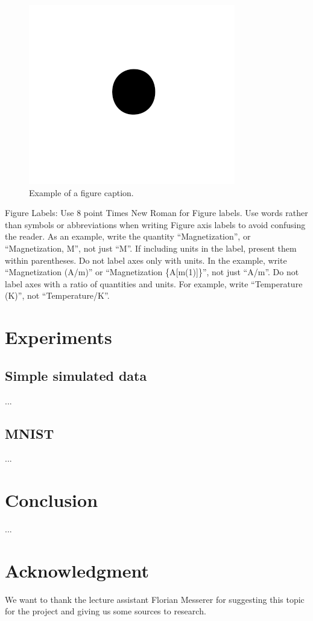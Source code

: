 \documentclass[conference]{IEEEtran}
\begin{document}
\begin{figure}[htbp]
\centerline{\includegraphics{fig1.png}}
\caption{Example of a figure caption.}
\label{fig}
\end{figure}

Figure Labels: Use 8 point Times New Roman for Figure labels. Use words 
rather than symbols or abbreviations when writing Figure axis labels to 
avoid confusing the reader. As an example, write the quantity 
``Magnetization'', or ``Magnetization, M'', not just ``M''. If including 
units in the label, present them within parentheses. Do not label axes only 
with units. In the example, write ``Magnetization (A/m)'' or ``Magnetization 
\{A[m(1)]\}'', not just ``A/m''. Do not label axes with a ratio of 
quantities and units. For example, write ``Temperature (K)'', not 
``Temperature/K''.

\section{Experiments}

\subsection{Simple simulated data}
...

\subsection{MNIST}
...

\section{Conclusion}
...

\section*{Acknowledgment}
We want to thank the lecture assistant Florian Messerer for suggesting this topic for the project and giving us some sources to research. 
\end{document}
